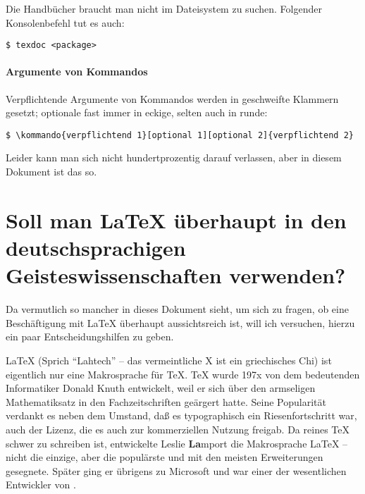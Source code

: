\documentclass[
	11pt,        %
	table,       %
	twoside,     %
	notitlepage, %
]{scrreprt}
\begin{document}
Die Handbücher braucht man nicht im Dateisystem zu suchen. Folgender Konsolenbefehl tut es auch:
\begin{lstlisting}
$ texdoc <package>
\end{lstlisting}

\paragraph{Argumente von Kommandos}
Verpflichtende Argumente von Kommandos werden in geschweifte Klammern gesetzt; optionale fast immer in eckige, selten auch in runde:
\begin{lstlisting}
$ \kommando{verpflichtend 1}[optional 1][optional 2]{verpflichtend 2}
\end{lstlisting}
Leider kann man sich nicht hundertprozentig darauf verlassen, aber in diesem Dokument ist das so.

\section{Soll man \LaTeX{} überhaupt in den deutschsprachigen Geisteswissenschaften verwenden?}

Da vermutlich so mancher in dieses Dokument sieht, um sich zu fragen, ob eine Beschäftigung mit \LaTeX{} überhaupt aussichtsreich ist, will ich versuchen, hierzu ein paar Entscheidungshilfen zu geben.

\LaTeX{} (Sprich \enquote{Lahtech} -- das vermeintliche X ist ein griechisches Chi) ist eigentlich nur eine Makrosprache für \TeX{}. \TeX{} wurde 197x von dem bedeutenden Informatiker Donald Knuth entwickelt, weil er sich über den armseligen Mathematiksatz in den Fachzeitschriften geärgert hatte. Seine Popularität verdankt es neben dem Umstand, daß es typographisch ein Riesenfortschritt war, auch der Lizenz, die es auch zur kommerziellen Nutzung freigab. Da reines \TeX{} schwer zu schreiben ist, entwickelte Leslie \textbf{La}mport die Makrosprache \LaTeX{} -- nicht die einzige, aber die populärste und mit den meisten Erweiterungen gesegnete. Später ging er übrigens zu Microsoft und war einer der wesentlichen Entwickler von .
\end{document}

